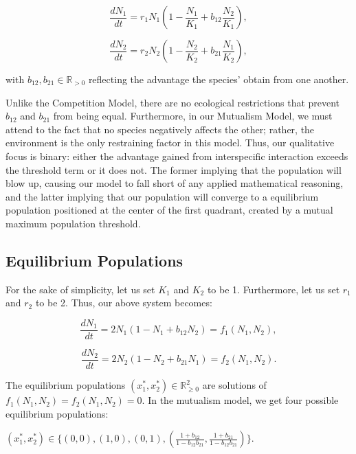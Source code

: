 \documentclass[11pt,a4paper]{scrartcl}
\theoremstyle{definition}
\begin{document}
\begin{equation} \label{eq18}
	\frac{dN_1}{dt}=r_1N_1(1-\frac{N_1}{K_1}+b_{12}\frac{N_2}{K_1}),
\end{equation}

\begin{equation} \label{eq19}
	\frac{dN_2}{dt}=r_2N_2(1-\frac{N_2}{K_2}+b_{21}\frac{N_1}{K_2}),
\end{equation}

with $b_{12}, b_{21} \in \mathbb{R}_{>0}$ reflecting the advantage the species' obtain from one another.

Unlike the Competition Model, there are no ecological restrictions that prevent $b_{12}$ and $b_{21}$ from being equal. Furthermore, in our Mutualism Model, we must attend to the fact that no species negatively affects the other; rather, the environment is the only restraining factor in this model. Thus, our qualitative focus is binary: either the advantage gained from interspecific interaction exceeds the threshold term or it does not. The former implying that the population will blow up, causing our model to fall short of any applied mathematical reasoning, and the latter implying that our population will converge to a equilibrium population positioned at the center of the first quadrant, created by a mutual maximum population threshold.
\newline

\subsection{Equilibrium Populations}

For the sake of simplicity, let us set $K_1$ and $K_2$ to be 1. Furthermore, let us set $r_1$ and $r_2$ to be 2. Thus, our above system becomes:

\begin{equation} \label{eq20}
	\frac{dN_1}{dt}=2N_1(1-N_1+b_{12}N_2)=f_1(N_1, N_2),
\end{equation}

\begin{equation} \label{eq21}
	\frac{dN_2}{dt}=2N_2(1-N_2+b_{21}N_1)=f_2(N_1, N_2).
\end{equation}

The equilibrium populations $(x_1^{*}, x_2^{*}) \in \mathbb{R}^2_{\geqslant 0}$ are solutions of $f_1(N_1, N_2)=f_2(N_1, N_2)=0$. In the mutualism model, we get four possible equilibrium populations:

\begin{center}
	$(x_1^{*}, x_2^{*}) \in \Big\{(0,0), (1,0), (0,1), (\frac{1+b_{12}}{1-b_{12}b_{21}}, \frac{1+b_{21}}{1-b_{12}b_{21}})\Big\}$.
\end{center}
\end{document}
